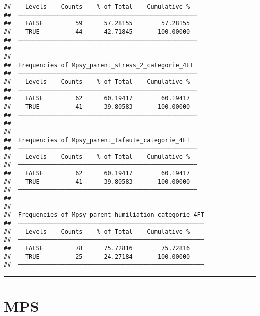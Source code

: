 \documentclass[
]{article}
\begin{document}
\begin{verbatim}
##    Levels    Counts    % of Total    Cumulative %   
##  ────────────────────────────────────────────────── 
##    FALSE         59      57.28155        57.28155   
##    TRUE          44      42.71845       100.00000   
##  ────────────────────────────────────────────────── 
## 
## 
##  Frequencies of Mpsy_parent_stress_2_categorie_4FT  
##  ────────────────────────────────────────────────── 
##    Levels    Counts    % of Total    Cumulative %   
##  ────────────────────────────────────────────────── 
##    FALSE         62      60.19417        60.19417   
##    TRUE          41      39.80583       100.00000   
##  ────────────────────────────────────────────────── 
## 
## 
##  Frequencies of Mpsy_parent_tafaute_categorie_4FT   
##  ────────────────────────────────────────────────── 
##    Levels    Counts    % of Total    Cumulative %   
##  ────────────────────────────────────────────────── 
##    FALSE         62      60.19417        60.19417   
##    TRUE          41      39.80583       100.00000   
##  ────────────────────────────────────────────────── 
## 
## 
##  Frequencies of Mpsy_parent_humiliation_categorie_4FT 
##  ──────────────────────────────────────────────────── 
##    Levels    Counts    % of Total    Cumulative %   
##  ──────────────────────────────────────────────────── 
##    FALSE         78      75.72816        75.72816   
##    TRUE          25      24.27184       100.00000   
##  ────────────────────────────────────────────────────
\end{verbatim}

\begin{center}\rule{0.5\linewidth}{0.5pt}\end{center}

\hypertarget{mps}{%
\section{MPS}\label{mps}}
\end{document}
